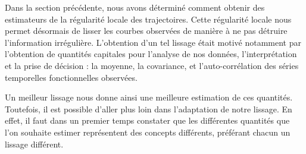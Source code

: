 
Dans la section précédente, nous avons déterminé comment obtenir des estimateurs de la régularité locale des trajectoires. Cette régularité locale nous permet désormais de lisser les courbes observées de manière à ne pas détruire l'information irrégulière. L'obtention d'un tel lissage était motivé notamment par l'obtention de quantités capitales pour l'analyse de nos données, l'interprétation et la prise de décision : la moyenne, la covariance, et l'auto-corrélation des séries temporelles fonctionnelles observées.

Un meilleur lissage nous donne ainsi une meilleure estimation de ces quantités. Toutefois, il est possible d'aller plus loin dans l'adaptation de notre lissage. En effet, il faut dans un premier temps constater que les différentes quantités que l'on souhaite estimer représentent des concepts différents, préférant chacun un lissage différent.

\smallskip

